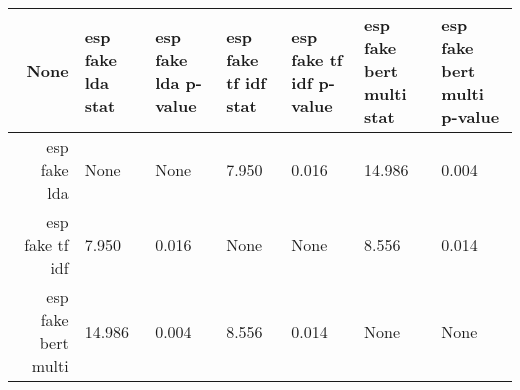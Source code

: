 \begin{tabular}{|r|l|l|l|l|l|l|}
  \hline
  None & esp fake lda stat & esp fake lda p-value & esp fake tf idf stat & esp fake tf idf p-value & esp fake bert multi stat & esp fake bert multi p-value \\ 
  \hline
  esp fake lda & None & None & 7.950 & 0.016 & 14.986 & 0.004 \\ 
  \hline
  esp fake tf idf & 7.950 & 0.016 & None & None & 8.556 & 0.014 \\ 
  \hline
  esp fake bert multi & 14.986 & 0.004 & 8.556 & 0.014 & None & None \\ 
  \hline
\end{tabular}

